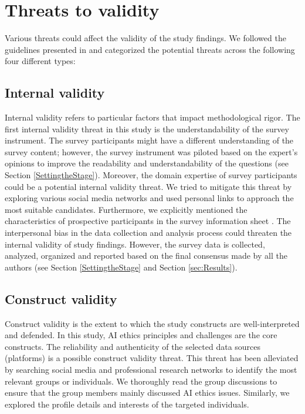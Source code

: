 
\section{Threats to validity}
\label{threats to validity}
Various threats could affect the validity of the study findings. We followed the guidelines presented in \cite{easterbrook2008selecting} and categorized the potential threats across the following four different types:
\subsection{Internal validity}
Internal validity refers to particular factors that impact methodological rigor. The first internal validity threat in this study is the understandability of the survey instrument. The survey participants might have a different understanding of the survey content; however, the survey instrument was piloted based on the expert's opinions to improve the readability and understandability of the questions (see Section \ref{SettingtheStage}). Moreover, the domain expertise of survey participants could be a potential internal validity threat. We tried to mitigate this threat by exploring various social media networks and used personal links to approach the most suitable candidates. Furthermore, we explicitly mentioned the characteristics of prospective participants in the survey information sheet \cite{replication}. The interpersonal bias in the data collection and analysis process could threaten the internal validity of study findings. However, the survey data is collected, analyzed, organized and reported based on the final consensus made by all the authors (see Section \ref{SettingtheStage} and Section \ref{sec:Results}). 
\subsection{Construct validity}
Construct validity is the extent to which the study constructs are well-interpreted and defended. In this study, AI ethics principles and challenges are the core constructs. The reliability and authenticity of the selected data sources (platforms) is a possible construct validity threat. This threat has been alleviated by searching social media and professional research networks to identify the most relevant groups or individuals. We thoroughly read the group discussions to ensure that the group members mainly discussed AI ethics issues. Similarly, we explored the profile details and interests of the targeted individuals. 
